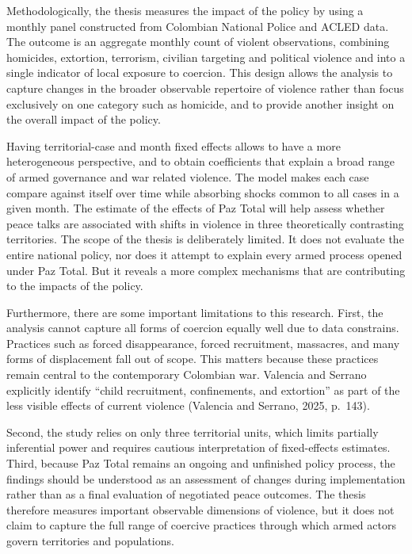 \documentclass[11pt]{article}
\begin{document}
Methodologically, the thesis measures the impact of the policy by using a monthly panel constructed from Colombian National Police and ACLED data. The outcome is an aggregate monthly count of violent observations, combining homicides, extortion, terrorism, civilian targeting and political violence and  into a single indicator of local exposure to coercion. This design allows the analysis to capture changes in the broader observable repertoire of violence rather than focus exclusively on one category such as homicide, and to provide another insight on the overall impact of the policy.

Having territorial-case and month fixed effects allows to have a more heterogeneous perspective, and to obtain coefficients that explain a broad range of armed governance and war related violence. The model makes each case compare against itself over time while absorbing shocks common to all cases in a given month. The estimate of the effects of Paz Total will help assess whether peace talks are associated with shifts in violence in three theoretically contrasting territories. The scope of the thesis is deliberately limited. It does not evaluate the entire national policy, nor does it attempt to explain every armed process opened under Paz Total. But it reveals a more complex mechanisms that are contributing to the impacts of the policy.

Furthermore, there are some important limitations to this research. First, the analysis cannot capture all forms of coercion equally well due to data constrains. Practices such as forced disappearance, forced recruitment, massacres, and many forms of displacement fall out of scope. This matters because these practices remain central to the contemporary Colombian war. Valencia and Serrano explicitly identify ``child recruitment, confinements, and extortion'' as part of the less visible effects of current violence (Valencia and Serrano, 2025, p.~143). 

Second, the study relies on only three territorial units, which limits partially inferential power and requires cautious interpretation of fixed-effects estimates. Third, because Paz Total remains an ongoing and unfinished policy process, the findings should be understood as an assessment of changes during implementation rather than as a final evaluation of negotiated peace outcomes. The thesis therefore measures important observable dimensions of violence, but it does not claim to capture the full range of coercive practices through which armed actors govern territories and populations. 
\end{document}
